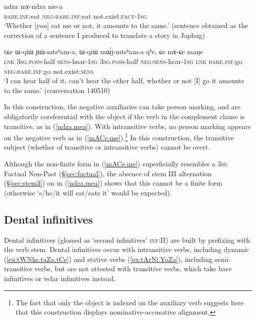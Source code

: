 \begin{exe}
\ex \label{ndza.mea}
\gll ndza mɤ-ndza me-a \\
\textsc{bare}.\textsc{inf}:eat \textsc{neg}-\textsc{bare}.\textsc{inf}:eat not.exist:\textsc{fact}-\textsc{1sg} \\
\glt `Whether [you] eat me or not, it amounts to the same.' (sentence obtained as the correction of a sentence I produced to translate a story in Japhug)
\end{exe}

\begin{exe}
\ex \label{mACe.me}
\gll tɕe ɯ-qiɯ ɲɯ-mtsʰam-a, ɯ-qiɯ mɯ́j-mtsʰam-a qʰe, ɕe mɤ-ɕe maŋe   \\
\textsc{lnk} \textsc{3sg}.\textsc{poss}-half \textsc{sens}-hear-\textsc{1sg} \textsc{3sg}.\textsc{poss}-half \textsc{neg}:\textsc{sens}-hear-\textsc{1sg} \textsc{lnk} \textsc{bare}.\textsc{inf}:go \textsc{neg}-\textsc{bare}.\textsc{inf}:go not.exist:\textsc{sens} \\
\glt `I can hear half of it, can't hear the other half, whether or not [I] go it amounts to the same.' (conversation 140510)
\end{exe}

In this construction, the negative auxiliaries can take person marking, and are obligatorily coreferential with the object if the verb in the complement clause is transitive, as in (\ref{ndza.mea}). With intransitive verbs, no person marking appears on the negative verb as in (\ref{mACe.me}).\footnote{The fact that only the object is indexed on the auxiliary verb suggests here that this construction displays nominative-accusative alignment.  }
In this construction, the transitive subject (whether of transitive or intransitive verbs) cannot be overt.

Although the non-finite form  in  (\ref{mACe.me}) superficially resembles a \textsc{3sg} Factual Non-Past (§\ref{sec:factual}), the absence of stem III alternation (§\ref{sec:stem3}) on  in (\ref{ndza.mea}) shows that this cannot be a finite form (otherwise  `s/he/it will eat/eats it' would be expected).

\subsection{Dental infinitives} \label{sec:dental.inf}
Dental infinitives (glossed as `second infinitives' \textsc{inf}:II) are built by prefixing  with the verb stem. Dental infinitives occur with intransitive verbs, including dynamic (\ref{ex:tWNke.taZa.tCe}) and stative verbs (\ref{ex:tArNi.YoZa}), including semi-transitive verbs, but are not attested with transitive verbs, which take bare infinitives or velar infinitives instead.

